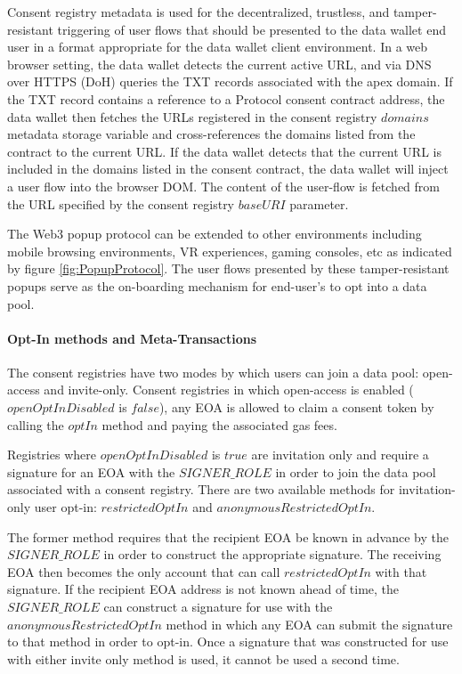 Consent registry metadata is used for the decentralized, trustless, and tamper-resistant triggering of user flows that should be presented to the data wallet 
end user in a format appropriate for the data wallet client environment. In a web browser setting, the data wallet detects the current active URL, and via DNS 
over HTTPS (DoH) queries the TXT records associated with the apex domain. If the TXT record contains a reference to a Protocol consent 
contract address, the data wallet then fetches the URLs registered in the consent registry $domains$ metadata storage variable and cross-references the domains 
listed from the contract to the current URL. If the data wallet detects that the current URL is included in the domains listed in the 
consent contract, the data wallet will inject a user flow into the browser DOM. The content of the user-flow is fetched from the URL specified by the consent 
registry $baseURI$ parameter. 

The Web3 popup protocol can be extended to other environments including mobile browsing environments, VR experiences, gaming consoles, etc as indicated by 
figure \ref{fig:PopupProtocol}. The user flows presented by these tamper-resistant popups serve as the on-boarding mechanism for end-user's to opt into a data pool.

\paragraph{Opt-In methods and Meta-Transactions}
\label{section:OptInMethods}

The consent registries have two modes by which users can join a data pool: open-access and invite-only. Consent registries in which open-access is 
enabled ($openOptInDisabled$ is $false$), any EOA is allowed to claim a consent token by calling the $optIn$ method and paying the associated gas
fees. 

Registries where $openOptInDisabled$ is $true$ are invitation only and require a signature for an EOA with the $SIGNER\_ROLE$ in order to join 
the data pool associated with a consent registry. There are two available methods for invitation-only user opt-in: $restrictedOptIn$ and $anonymousRestrictedOptIn$. 

The former method
requires that the recipient EOA be known in advance by the $SIGNER\_ROLE$ in order to construct the appropriate signature. The receiving EOA then 
becomes the only account that can call $restrictedOptIn$ with that signature. If the recipient EOA address is not known ahead of time, the $SIGNER\_ROLE$
can construct a signature for use with the $anonymousRestrictedOptIn$ method in which any EOA can submit the signature to that method in order to opt-in. Once a signature that was constructed for use with either invite only method is used, it cannot be used a second time. 


